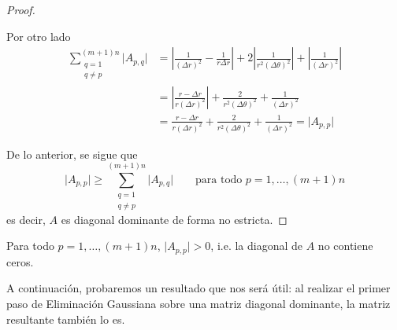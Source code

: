 \begin{proof}
\begin{itemize}
          Por otro lado
            \[ \begin{split}
              \sum_{\substack{q=1 \\ q \neq p}}^{(m+1)n} \vert A_{p,q} \vert &= \left \vert \frac{1}{(\Delta r)^2} - \frac{1}{r \Delta r} \right \vert + 2 \left \vert \frac{1}{r^2 (\Delta \theta)^2} \right \vert + \left \vert \frac{1}{(\Delta r)^2} \right \vert \\
              &= \left \vert \frac{r - \Delta r}{r (\Delta r)^2} \right \vert + \frac{2}{r^2 (\Delta \theta)^2} + \frac{1}{(\Delta r)^2} \\
              &= \frac{r - \Delta r}{r (\Delta r)^2} + \frac{2}{r^2 (\Delta \theta)^2} + \frac{1}{(\Delta r)^2} = \vert A_{p,p} \vert
            \end{split} \]
        \end{itemize}

        De lo anterior, se sigue que
          \[ \vert A_{p,p} \vert \geq \sum_{\substack{q=1 \\ q \neq p}}^{(m+1)n} \vert A_{p,q} \vert \qquad \text{para todo $p = 1, \dots, (m+1)n$} \]
        es decir, $A$ es diagonal dominante de forma no estricta.
      \end{proof}

      \begin{obs}
        \label{obs:Diagonal de A sin ceros}
        Para todo $p = 1, \dots, (m+1)n$, $\vert A_{p,p} \vert > 0$, i.e. la diagonal de $A$ no contiene ceros.
      \end{obs}

      A continuación, probaremos un resultado que nos será útil: al realizar el primer paso de Eliminación Gaussiana sobre una matriz diagonal dominante, la matriz resultante también lo es.

